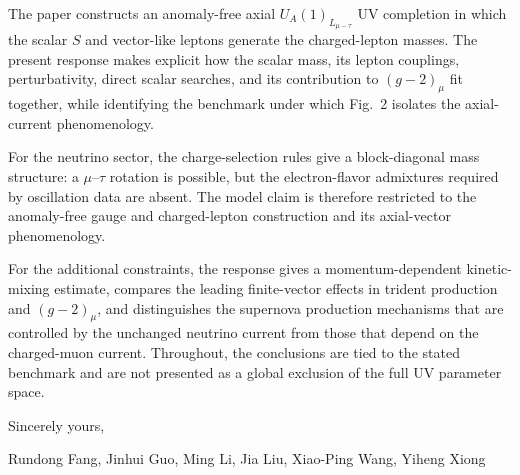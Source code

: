 \documentclass[12pt,a4paper]{article}
\begin{document}
\medskip
{}

The paper constructs an anomaly-free axial \(U_A(1)_{L_{\mu-\tau}}\) UV completion in which the scalar \(S\) and vector-like leptons generate the charged-lepton masses. The present response makes explicit how the scalar mass, its lepton couplings, perturbativity, direct scalar searches, and its contribution to \((g-2)_\mu\) fit together, while identifying the benchmark under which Fig.~2 isolates the axial-current phenomenology.

For the neutrino sector, the charge-selection rules give a block-diagonal mass structure: a \(\mu\)--\(\tau\) rotation is possible, but the electron-flavor admixtures required by oscillation data are absent. The model claim is therefore restricted to the anomaly-free gauge and charged-lepton construction and its axial-vector phenomenology.

For the additional constraints, the response gives a momentum-dependent kinetic-mixing estimate, compares the leading finite-vector effects in trident production and \((g-2)_\mu\), and distinguishes the supernova production mechanisms that are controlled by the unchanged neutrino current from those that depend on the charged-muon current. Throughout, the conclusions are tied to the stated benchmark and are not presented as a global exclusion of the full UV parameter space.

\noindent Sincerely yours,

\noindent Rundong Fang, Jinhui Guo, Ming Li, Jia Liu, Xiao-Ping Wang, Yiheng Xiong



\end{document}
